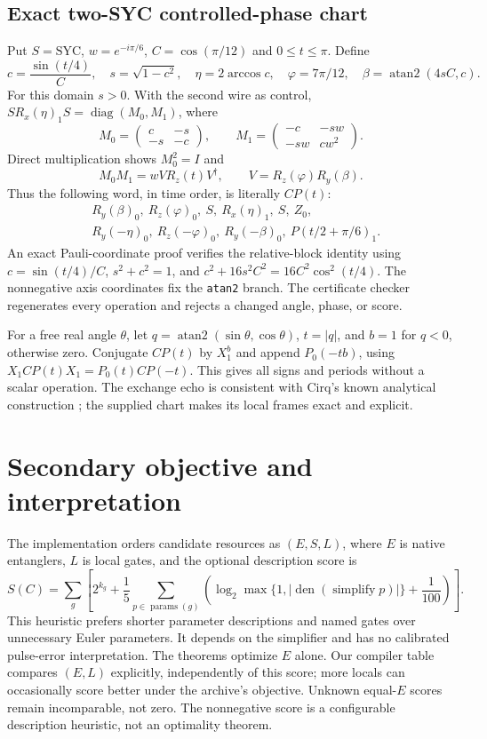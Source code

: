 \documentclass[11pt]{article}
\begin{document}
\subsection{Exact two-SYC controlled-phase chart}
Put $S=\mathrm{SYC}$, $w=e^{-i\pi/6}$, $C=\cos(\pi/12)$ and
$0\le t\le\pi$. Define
\[
 c=\frac{\sin(t/4)}{C},\quad s=\sqrt{1-c^2},\quad
 \eta=2\arccos c,\quad\varphi=7\pi/12,\quad
 \beta=\operatorname{atan2}(4sC,c).
\]
For this domain $s>0$. With the second wire as control,
$S R_x(\eta)_1 S=\operatorname{diag}(M_0,M_1)$, where
\[
 M_0=\begin{pmatrix}c&-s\\-s&-c\end{pmatrix},\qquad
 M_1=\begin{pmatrix}-c&-sw\\-sw&cw^2\end{pmatrix}.
\]
Direct multiplication shows $M_0^2=I$ and
\[
 M_0M_1=w V R_z(t)V^\dagger,\qquad
 V=R_z(\varphi)R_y(\beta).
\]
Thus the following word, in time order, is literally $CP(t)$:
\begin{align*}
 &R_y(\beta)_0,\ R_z(\varphi)_0,\ S,\ R_x(\eta)_1,\ S,\ Z_0,\\
 &R_y(-\eta)_0,\ R_z(-\varphi)_0,\ R_y(-\beta)_0,
 \ P(t/2+\pi/6)_1.
\end{align*}
An exact Pauli-coordinate proof verifies the relative-block identity using
$c=\sin(t/4)/C$, $s^2+c^2=1$, and
$c^2+16s^2C^2=16C^2\cos^2(t/4)$. The nonnegative axis coordinates fix the
\texttt{atan2} branch. The certificate checker regenerates every operation
and rejects a changed angle, phase, or score.

For a free real angle $\theta$, let
$q=\operatorname{atan2}(\sin\theta,\cos\theta)$, $t=|q|$, and
$b=1$ for $q<0$, otherwise zero. Conjugate $CP(t)$ by $X_1^b$ and append
$P_0(-tb)$, using $X_1CP(t)X_1=P_0(t)CP(-t)$.
This gives all signs and periods without a scalar operation.
The exchange echo is consistent with Cirq's known analytical construction
\cite{cirqsyc}; the supplied chart makes its local frames exact and explicit.

\section{Secondary objective and interpretation}
The implementation orders candidate resources as $(E,S,L)$, where $E$ is
native entanglers, $L$ is local gates, and the optional description score is
\begin{equation}
 S(C)=\sum_g\left[2^{k_g}+\frac15\sum_{p\in\operatorname{params}(g)}
 \left(\log_2\max\{1,|\operatorname{den}(\operatorname{simplify}p)|\}
 +\frac1{100}\right)\right].
\end{equation}
This heuristic prefers shorter parameter descriptions and named gates over
unnecessary Euler parameters. It depends on the simplifier and has no
calibrated pulse-error interpretation. The theorems optimize $E$ alone.
Our compiler table compares $(E,L)$ explicitly, independently of this score;
more locals can occasionally score better under the archive's objective.
Unknown equal-$E$ scores remain incomparable, not zero. The nonnegative score is a configurable description heuristic, not an
optimality theorem.
\end{document}
